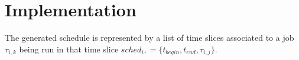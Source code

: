

\section{Implementation}
\label{sec:implementation}

The generated schedule is represented by a list of time slices associated to a job $\tau_{i,k}$ being run in that time slice $sched_i, = \{t_{begin}, t_{end}, \tau_{i,j}\}$.
